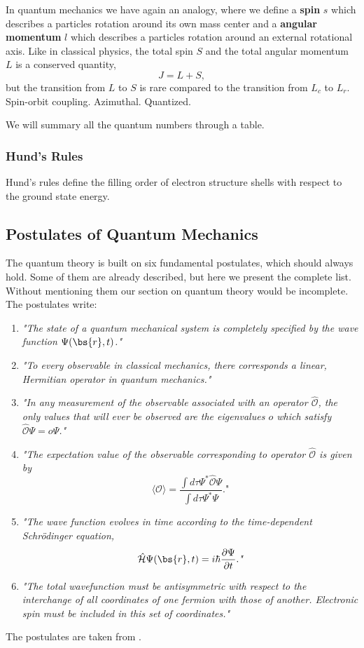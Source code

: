 In quantum mechanics we have again an analogy, where we define a \textbf{spin} $s$ which describes a particles rotation around its own mass center and a \textbf{angular momentum} $l$ which describes a particles rotation around an external rotational axis. Like in classical physics, the total spin $S$ and the total angular momentum $L$ is a conserved quantity,
\begin{equation}
J=L+S,
\end{equation}
but the transition from $L$ to $S$ is rare compared to the transition from $L_c$ to $L_r$. Spin-orbit coupling. Azimuthal. Quantized.

We will summary all the quantum numbers through a table. 

\subsubsection*{Hund's Rules}
Hund's rules define the filling order of electron structure shells with respect to the ground state energy. 
\fi

\subsection{Postulates of Quantum Mechanics} \label{sec:postulates}
The quantum theory is built on six fundamental postulates, which should always hold. Some of them are already described, but here we present the complete list. Without mentioning them our section on quantum theory would be incomplete. The postulates write:

\begin{enumerate}
\item \textit{"The state of a quantum mechanical system is completely specified by the wave function $\Psi(\bs{r},t)$."}

\item \textit{"To every observable in classical mechanics, there corresponds a linear, Hermitian operator in quantum mechanics."}

\item \textit{"In any measurement of the observable associated with an operator $\hat{\mathcal{O}}$, the only values that will ever be observed are the eigenvalues $o$ which satisfy $\hat{\mathcal{O}}\Psi=o\Psi$."}

\item \textit{"The expectation value of the observable corresponding to operator $\hat{\mathcal{O}}$ is given by
$$\langle\mathcal{O}\rangle=\frac{\int d\tau\Psi^*\hat{\mathcal{O}}\Psi}{\int d\tau\Psi^*\Psi}.\textit{"}$$}

\item \textit{"The wave function evolves in time according to the time-dependent Schrödinger equation,
$$\hat{\mathcal{H}}\Psi(\bs{r},t)=i\hbar\frac{\partial\Psi}{\partial t}.\textit{"}$$}

\item \textit{"The total wavefunction must be antisymmetric with respect to the interchange of all coordinates of one fermion with those of another. Electronic spin must be included in this set of coordinates."} 
\end{enumerate}
The postulates are taken from \cite{sherrill_david_postulates_2003}.

